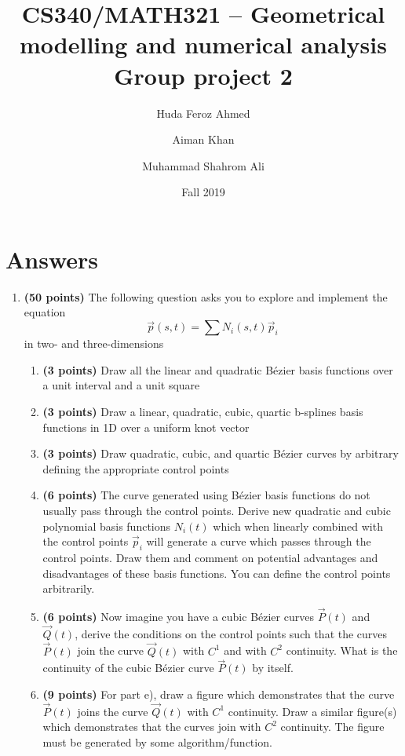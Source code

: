 \documentclass[a4paper, 11pt]{article}
\title{CS340/MATH321 -- Geometrical modelling and numerical analysis \\ Group project 2}
\date{Fall 2019}
\author{Huda Feroz Ahmed \and Aiman Khan \and Muhammad Shahrom Ali}
\begin{document}
\maketitle  
\setlength{\parskip}{10pt}
\setlength{\parindent}{0pt}


\section*{Answers}
\begin{enumerate}
    
\item \textbf{(50 points)} The following question asks you to explore and implement the equation \[\vec p(s, t) = \sum N_i(s, t) \vec p_i\] in two- and three-dimensions

\begin{enumerate}[label=\alph*.]
    \item \textbf{(3 points)} Draw all the linear and quadratic B\'{e}zier basis functions over a unit interval and a unit square
    \item \textbf{(3 points)} Draw a linear, quadratic, cubic, quartic b-splines basis functions in 1D over a uniform knot vector
    \item \textbf{(3 points)} Draw quadratic, cubic, and quartic B\'{e}zier curves by arbitrary defining the appropriate control points
    \item \textbf{(6 points)} The curve generated using B\'{e}zier basis functions do not usually pass through the control points. Derive new quadratic and cubic polynomial basis functions $N_i(t)$ which when linearly combined with the control points $\vec p_i$ will generate a curve which passes through the control points. Draw them and comment on potential advantages and disadvantages of these basis functions. You can define the control points arbitrarily. 
    \item \textbf{(6 points)} Now imagine you have a cubic B\'{e}zier curves $\vec P(t)$ and $\vec Q(t)$, derive the conditions on the control points such that the curves $\vec P(t)$ join the curve $\vec Q(t)$ with $C^1$ and with $C^2$ continuity. What is the continuity of the cubic B\'{e}zier curve $\vec P(t)$ by itself.
    \item \textbf{(9 points)} For part e), draw a figure which demonstrates that the curve $\vec P(t)$ joins the curve $\vec Q(t)$ with $C^1$ continuity. Draw a similar figure(s) which demonstrates that the curves join with $C^2$ continuity. The figure must be generated by some algorithm/function.

\end{enumerate}
\end{enumerate}
\end{document}
